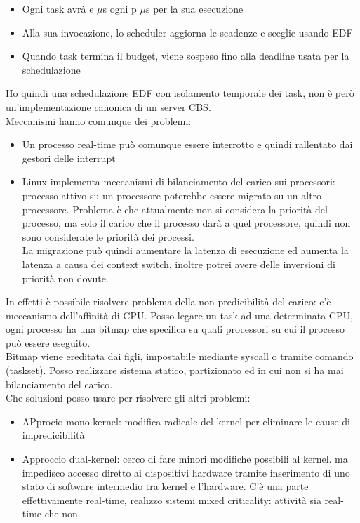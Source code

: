\documentclass[12pt, oneside]{extbook}
\begin{document}
\begin{itemize}
\item Ogni task avrà e $\mu$s ogni p $\mu$s per la sua esecuzione
\item Alla sua invocazione, lo scheduler aggiorna le scadenze e sceglie usando EDF
\item Quando task termina il budget, viene sospeso fino alla deadline usata per la schedulazione
\end{itemize}
Ho quindi una schedulazione EDF con isolamento temporale dei task, non è però un'implementazione canonica di un server CBS.\\ Meccanismi hanno comunque dei problemi:
\begin{itemize}
\item Un processo real-time può comunque essere interrotto e quindi rallentato dai gestori delle interrupt
\item Linux implementa meccanismi di bilanciamento del carico sui processori: processo attivo su un processore poterebbe essere migrato su un altro processore. Problema è che attualmente non si considera la priorità del processo, ma solo il carico che il processo darà a quel processore, quindi non sono considerate le priorità dei processi.\\ La migrazione può quindi aumentare la latenza di esecuzione ed aumenta la latenza a causa dei context switch, inoltre potrei avere delle inversioni di priorità non dovute.
\end{itemize}
In effetti è possibile risolvere problema della non predicibilità del carico: c'è meccanismo dell'affinità di CPU. Posso legare un task ad una determinata CPU, ogni processo ha una bitmap  che specifica su quali processori su cui il processo può essere eseguito.\\ Bitmap viene ereditata dai figli, impostabile mediante syscall o tramite comando (taskset). Posso realizzare sistema statico, partizionato ed in  cui non si ha mai bilanciamento del carico.\\ Che soluzioni posso usare per risolvere gli altri problemi:
\begin{itemize}
\item APprocio mono-kernel: modifica radicale del kernel per eliminare le cause di impredicibilità
\item Approccio dual-kernel: cerco di fare minori modifiche possibili al kernel. ma impedisco accesso diretto ai dispositivi hardware tramite inserimento di uno stato di software intermedio tra kernel e l'hardware. C'è una parte effettivamente real-time, realizzo sistemi mixed criticality: attività sia real-time che non.
\end{itemize}
\end{document}
